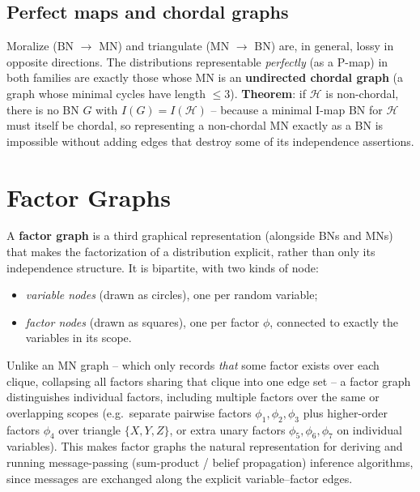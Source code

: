\documentclass[11pt]{article}
\begin{document}
\subsection{Perfect maps and chordal graphs}

Moralize (BN $\to$ MN) and triangulate (MN $\to$ BN) are, in general, lossy
in opposite directions. The distributions representable \emph{perfectly}
(as a P-map) in both families are exactly those whose MN is an
\textbf{undirected chordal graph} (a graph whose minimal cycles have length
$\le 3$). \textbf{Theorem}: if $\mathcal{H}$ is non-chordal, there is no BN
$G$ with $I(G) = I(\mathcal{H})$ -- because a minimal I-map BN for
$\mathcal{H}$ must itself be chordal, so representing a non-chordal MN
exactly as a BN is impossible without adding edges that destroy some of its
independence assertions.

\section{Factor Graphs}

A \textbf{factor graph} is a third graphical representation (alongside BNs
and MNs) that makes the factorization of a distribution explicit, rather
than only its independence structure. It is bipartite, with two kinds of
node:

\begin{itemize}
  \item \emph{variable nodes} (drawn as circles), one per random variable;
  \item \emph{factor nodes} (drawn as squares), one per factor $\phi$,
    connected to exactly the variables in its scope.
\end{itemize}

Unlike an MN graph -- which only records \emph{that} some factor exists
over each clique, collapsing all factors sharing that clique into one edge
set -- a factor graph distinguishes individual factors, including multiple
factors over the same or overlapping scopes (e.g.\ separate pairwise
factors $\phi_1,\phi_2,\phi_3$ plus higher-order factors $\phi_4$ over
triangle $\{X,Y,Z\}$, or extra unary factors $\phi_5,\phi_6,\phi_7$ on
individual variables). This makes factor graphs the natural representation
for deriving and running message-passing (sum-product / belief
propagation) inference algorithms, since messages are exchanged along the
explicit variable--factor edges.
\end{document}
